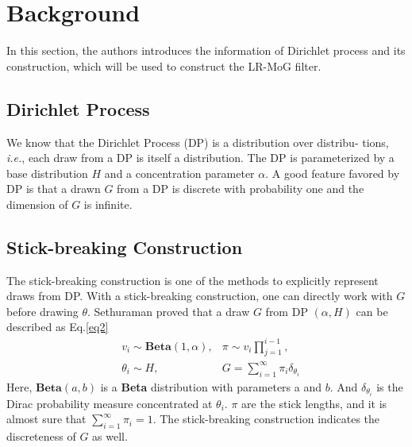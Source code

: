 \documentclass[10pt,twocolumn,letterpaper]{article}
\begin{document}
\section{Background}
In this section, the authors introduces the information of Dirichlet process and its
construction, which will be used to construct the LR-MoG filter.
\subsection{Dirichlet Process}
We know that the Dirichlet Process (DP) is a distribution over distribu-
tions, \textit{i.e.}, each draw from a DP is itself a distribution. The
DP is parameterized by a base distribution $H$ and a concentration parameter $\alpha$. A good feature favored by DP is that a
drawn $G$ from a DP is discrete with probability one and
the dimension of $G$ is infinite.
\subsection{Stick-breaking Construction}
The stick-breaking construction is one of the
methods to explicitly represent draws from DP. With a stick-breaking construction, one can directly work with $G$ before drawing $\theta$. Sethuraman proved that a draw $G$ from
DP $\left(α,H\right)$ can be described as Eq.\ref{eq2}
\begin{equation}
\begin{aligned}
&v_i \sim \textbf{Beta}\left(1,\alpha \right), &\pi \sim v_i \prod_{j=1}^{i-1},\\
&\theta_i \sim H, &G = \sum_{i=1}^{\infty}\pi_i \delta_{\theta_i}
\end{aligned}
\label{eq2}
\end{equation}
Here, $\textbf{Beta}\left(a,b\right)$ is a \textbf{Beta} distribution with parameters a
and $b$. And $\delta_{\theta_i}$ is the Dirac probability measure concentrated
at $\theta_i$. $\pi$ are the stick lengths, and it is almost sure that
$\sum_{i=1}^{\infty}\pi_i = 1$. The stick-breaking construction indicates the
discreteness of $G$ as well.
{\small
	
	
}
\end{document}
